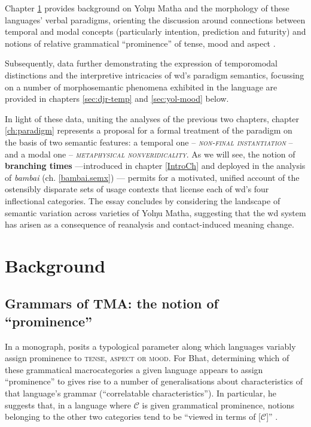 Chapter \ref{yol-bkgd} provides background on Yolŋu Matha and the morphology of these languages' verbal paradigms, orienting the discussion around connections between temporal and modal concepts (particularly intention, prediction and futurity) and notions of relative grammatical ``prominence'' of tense, mood and aspect \citep[\textit{cf.}][]{Bhat1999}. %



Subsequently, data further demonstrating the expression of temporomodal distinctions and the interpretive intricacies of \acrshort{wd}'s paradigm semantics, focussing on a number of morphosemantic phenomena exhibited in the language are provided in chapters \ref{sec:djr-temp} and \ref{sec:yol-mood} below. 

In light of these data, uniting the analyses of the previous two chapters, chapter \ref{ch:paradigm} represents a proposal for a formal treatment of the paradigm on the basis of two semantic features: a temporal one -- \textsc{\textit{non-final instantiation}} -- and a modal one -- \textsc{\textit{metaphysical nonveridicality}}. As we will see, the notion of \textbf{branching times} ---introduced in chapter \ref{IntroCh} and deployed in the analysis of \textit{bambai} (ch. \ref{bambai.semx}) --- permits for a motivated, unified account of the ostensibly disparate sets of usage contexts that license each of \gls{wd}'s four inflectional categories. The essay concludes by considering the landscape of semantic variation across varieties of Yolŋu Matha, suggesting that the \gls{wd} system has arisen as a consequence of reanalysis and contact-induced meaning change.

\chapter{Background}\label{yol-bkgd}

\section{Grammars of TMA: the notion of ``prominence''}

In a \citeyear{Bhat1999} monograph, \citeauthor{Bhat1999} posits a typological parameter along which languages variably assign prominence to \textsc{tense, aspect \textup{or} mood}. For Bhat, determining which of these grammatical macrocategories a given language appears to assign ``prominence'' to gives rise to a number of generalisations about characteristics of that language's grammar (``correlatable characteristics''). In particular, he suggests that, in a language where $ \mathcal C $ is given grammatical prominence, notions belonging to the other two categories tend to be ``viewed in terms of [$ \mathcal C $]'' \citeyearpar[7]{Bhat1999}.


